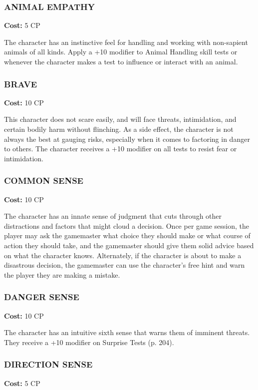 \subsubsection{ANIMAL EMPATHY}
\textbf{Cost:} 5 CP

The character has an instinctive feel for handling and working with non-sapient
animals of all kinds.  Apply a +10 modifier to Animal Handling skill tests or
whenever the character makes a test to influence or interact with an animal.

\subsubsection{BRAVE}
\textbf{Cost:} 10 CP

This character does not scare easily, and will face threats, intimidation, and
certain bodily harm without flinching. As a side effect, the character is not
always the best at gauging risks, especially when it comes to factoring in
danger to others. The character receives a +10 modifier on all tests to
resist fear or intimidation.

\subsubsection{COMMON SENSE}
\textbf{Cost:} 10 CP

The character has an innate sense of judgment that cuts through other
distractions and factors that might cloud a decision. Once per game session,
the player may ask the gamemaster what choice they should make or what course
of action they should take, and the gamemaster should give them solid advice
based on what the character knows. Alternately, if the character is about to
make a disastrous decision, the gamemaster can use the character’s free hint
and warn the player they are making a mistake.

\subsubsection{DANGER SENSE}
\textbf{Cost:} 10 CP

The character has an intuitive sixth sense that warns them of imminent
threats. They receive a +10 modifier on Surprise Tests (p. 204).

\subsubsection{DIRECTION SENSE}
\textbf{Cost:} 5 CP

